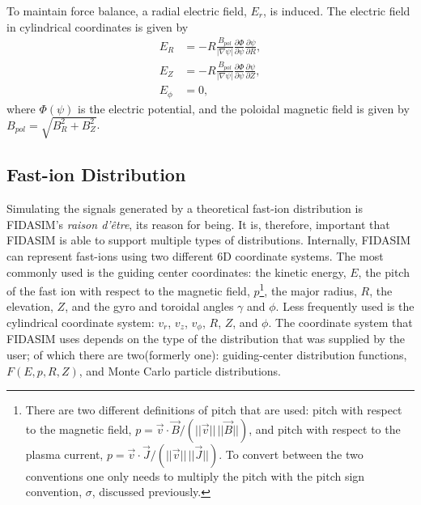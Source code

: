 To maintain force balance, a radial electric field, $E_r$, is induced. The electric field in cylindrical coordinates is given by
\begin{equation}\label{eq:efield}
\begin{split}
    E_R &= -R \frac{B_{pol}}{|\nabla \psi|} \frac{\partial \Phi}{\partial \psi} \frac{\partial \psi}{\partial R},\\
    E_Z &= -R \frac{B_{pol}}{|\nabla \psi|} \frac{\partial \Phi}{\partial \psi} \frac{\partial \psi}{\partial Z},\\
    E_{\phi} &= 0,
\end{split}
\end{equation}
where $\Phi(\psi)$ is the electric potential, and the poloidal magnetic field is given by $B_{pol} = \sqrt{B_R^2 + B_Z^2}$.


\subsection{Fast-ion Distribution}
Simulating the signals generated by a theoretical fast-ion distribution is FIDASIM's \textit{raison d'\^etre}, its reason for being. It is, therefore, important that FIDASIM is able to support multiple types of distributions.
Internally, FIDASIM can represent fast-ions using two different 6D coordinate systems. The most commonly used is the guiding center coordinates: the kinetic energy, $E$, the pitch of the fast ion with respect to the magnetic field, $p$\footnote{There are two different definitions of pitch that are used: pitch with respect to the magnetic field, $p = \vec{v}\cdot\vec{B}/(||\vec{v}||\,||\vec{B}||)$, and pitch with respect to the plasma current, $p = \vec{v}\cdot\vec{J}/(||\vec{v}||\,||\vec{J}||)$. To convert between the two conventions one only needs to multiply the pitch with the pitch sign convention, $\sigma$, discussed previously.}, the major radius, $R$, the elevation, $Z$, and the gyro and toroidal angles $\gamma$ and $\phi$. Less frequently used is the cylindrical coordinate system: $v_r$, $v_z$, $v_\phi$, $R$, $Z$, and $\phi$.
The coordinate system that FIDASIM uses depends on the type of the distribution that was supplied by the user; of which there are two(formerly one): guiding-center distribution functions, $F(E,p,R,Z)$, and Monte Carlo particle distributions.

